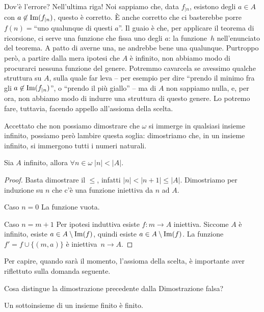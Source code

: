 Dov'\`e l'errore? Nell'ultima riga! Noi sappiamo che, data $f_{|n}$, esistono degli $a \in A$ con $a \not\in\operatorname{Im}(f_{|n})$, questo \`e corretto. \`E anche corretto che ci basterebbe porre $f(n) =$``uno qualunque di questi $a$''.
Il guaio \`e che, per applicare il teorema di ricorsione, ci serve una
funzione che fissa uno degli $a$: la funzione~$h$ nell'enunciato del
teorema.
A patto di averne una, ne andrebbe bene una qualunque. Purtroppo per\`o, a
partire dalla mera ipotesi che $A$ \`e infinito, non abbiamo modo di
procurarci nessuna funzione del genere. Potremmo cavarcela se avessimo
qualche struttura su $A$, sulla quale far leva -- per esempio per dire
``prendo il minimo 
fra gli $a \not\in \operatorname{Im}(f_{|n})$'', o ``prendo il pi\`u giallo'' -- ma di
$A$ non sappiamo nulla, e, per ora, non abbiamo modo di indurre una struttura di questo genere.
Lo potremo fare, tuttavia, facendo appello all'assioma della scelta.

Accettato che non possiamo dimostrare che $\omega$ si immerge in qualsiasi insieme infinito, possiamo per\`o lambire questa soglia: dimostriamo che, in un insieme infinito, si immergono tutti i numeri naturali.

\begin{proposition}
	Sia $A$ infinito, allora $\forall {n\in \omega} \; |n| < |A|$.
\end{proposition}

\begin{proof}
	Basta dimostrare il $\leq$, infatti $|n| < |n+1| \leq |A|$. Dimostriamo per induzione su $n$ che c'\`e una funzione iniettiva da $n$ ad $A$.

{\drkred Caso $n = 0$} La funzione vuota.

{\drkred Caso $n = m+1$} Per ipotesi induttiva esiste $f\colon m
\rightarrow A$ iniettiva. Siccome $A$ \`e infinito, esiste $a\in A
\setminus \operatorname{Im}(f)$, quindi esiste $a \in A \setminus \operatorname{Im}(f)$.
La funzione $f' = f \cup \{(m,a)\}$ \`e iniettiva~$n\to A$.
\end{proof}

Per capire, quando sar\`a il momento, l'assioma della scelta, \`e
{\drkred importante} aver riflettuto sulla domanda seguente.

\begin{exercise}
Cosa distingue la dimostrazione precedente dalla {\drkgrn Dimostrazione
falsa?}
\end{exercise}

\begin{corollary}
	Un sottoinsieme di un insieme finito \`e finito.
\end{corollary}

